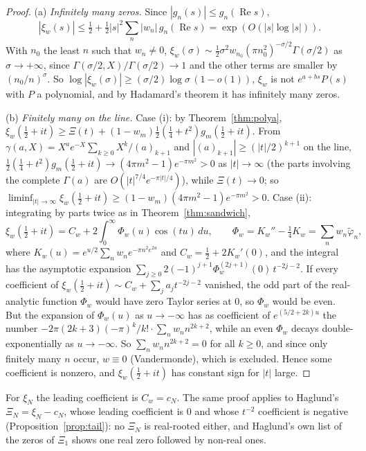 \documentclass[11pt]{article}
\theoremstyle{plain}
\theoremstyle{definition}
\theoremstyle{remark}
\newcommand{\re}{\operatorname{Re}}
\newcommand{\tphi}{\widetilde{\varphi}}
\begin{document}
\begin{proof}
(a) \emph{Infinitely many zeros.} Since $|g_n(s)| \le g_n(\re s)$,
\[
|\xi_w(s)| \le \tfrac12 + \tfrac12|s|^2\sum_n|w_n|\,g_n(\re s)
= \exp(O(|s|\log|s|)).
\]
With $n_0$ the least $n$ such that $w_n \ne 0$,
$\xi_w(\sigma) \sim \tfrac12\sigma^2 w_{n_0}(\pi n_0^2)^{-\sigma/2}
\Gamma(\sigma/2)$ as $\sigma \to +\infty$, since
$\Gamma(\sigma/2, X)/\Gamma(\sigma/2) \to 1$ and the other terms are smaller by
$(n_0/n)^\sigma$. So $\log|\xi_w(\sigma)| \ge (\sigma/2)\log\sigma\,(1 - o(1))$,
$\xi_w$ is not $e^{a+bs}P(s)$ with $P$ a polynomial, and by Hadamard's theorem it
has infinitely many zeros.

(b) \emph{Finitely many on the line.} Case (i): by Theorem~\ref{thm:polya},
$\xi_w(\tfrac12+it) \ge \Xi(t) + (1 - w_m)\tfrac12(\tfrac14+t^2)g_m(\tfrac12+it)$.
From $\gamma(a, X) = X^a e^{-X}\sum_{k \ge 0}X^k/(a)_{k+1}$ and
$|(a)_{k+1}| \ge (|t|/2)^{k+1}$ on the line,
$\tfrac12(\tfrac14+t^2)g_m(\tfrac12+it) \to (4\pi m^2 - 1)e^{-\pi m^2} > 0$ as
$|t| \to \infty$ (the parts involving the complete $\Gamma(a)$ are
$O(|t|^{7/4}e^{-\pi|t|/4})$), while $\Xi(t) \to 0$; so
$\liminf_{|t|\to\infty}\xi_w(\tfrac12+it) \ge (1 - w_m)(4\pi m^2 - 1)e^{-\pi m^2}
> 0$. Case (ii): integrating by parts twice as in Theorem~\ref{thm:sandwich},
\[
\xi_w(\tfrac12+it) = C_w + 2\int_0^\infty \Phi_w(u)\cos(tu)\,du, \qquad
\Phi_w = K_w'' - \tfrac14 K_w = \sum_n w_n\tphi_n,
\]
where $K_w(u) = e^{u/2}\sum_n w_n e^{-\pi n^2 e^{2u}}$ and
$C_w = \tfrac12 + 2K_w'(0)$, and the integral has the asymptotic expansion
$\sum_{j \ge 0}2(-1)^{j+1}\Phi_w^{(2j+1)}(0)\,t^{-2j-2}$. If every coefficient of
$\xi_w(\tfrac12+it) \sim C_w + \sum_j a_j t^{-2j-2}$ vanished, the odd part of the
real-analytic function $\Phi_w$ would have zero Taylor series at $0$, so $\Phi_w$
would be even. But the expansion of $\Phi_w(u)$ as $u \to -\infty$ has as
coefficient of $e^{(5/2+2k)u}$ the number
$-2\pi(2k+3)(-\pi)^k/k!\cdot\sum_n w_n n^{2k+2}$, while an even $\Phi_w$ decays
double-exponentially as $u \to -\infty$. So $\sum_n w_n n^{2k+2} = 0$ for all
$k \ge 0$, and since only finitely many $n$ occur, $w \equiv 0$ (Vandermonde),
which is excluded. Hence some coefficient is nonzero, and $\xi_w(\tfrac12+it)$
has constant sign for $|t|$ large.
\end{proof}

For $\xi_N$ the leading coefficient is $C_w = c_N$. The same proof applies to
Haglund's $\Xi_N = \xi_N - c_N$, whose leading coefficient is $0$ and whose
$t^{-2}$ coefficient is negative (Proposition~\ref{prop:tail}): no $\Xi_N$ is
real-rooted either, and Haglund's own list of the zeros of $\Xi_1$ \cite[p.~16]{Hag}
shows one real zero followed by non-real ones.
\end{document}
